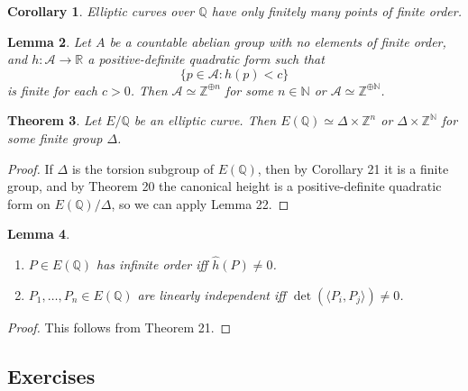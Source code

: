 \documentclass[a4paper]{article}
\newtheorem{theorem}{Theorem}
\newtheorem{lemma}[theorem]{Lemma}
\newtheorem{corollary}[theorem]{Corollary}
\theoremstyle{definition}
\newcommand{\A}{\mathcal{A}}
\newcommand{\N}{\mathbb{N}}
\newcommand{\Z}{\mathbb{Z}}
\newcommand{\Q}{\mathbb{Q}}
\newcommand{\R}{\mathbb{R}}
\begin{document}
\begin{corollary}
    Elliptic curves over $\Q$ have only finitely many points of finite order.
\end{corollary}

\begin{lemma}
    Let $A$ be a countable abelian group with no elements of finite order, and
    $h:\A\to\R$ a positive-definite quadratic form such that
    \begin{equation*}
        \{p\in\A:h(p)<c\}
    \end{equation*}
    is finite for each $c>0$. Then $\A\simeq\Z^{\oplus n}$ for some $n\in\N$ or
    $\A\simeq\Z^{\oplus\N}$.
\end{lemma}

\begin{theorem}
    Let $E/\Q$ be an elliptic curve. Then $E(\Q)\simeq\Delta\times\Z^n$ or
    $\Delta\times\Z^\N$ for some finite group $\Delta$.
\end{theorem}

\begin{proof}
    If $\Delta$ is the torsion subgroup of $E(\Q)$, then by Corollary 21 it is a
    finite group, and by Theorem 20 the canonical height is a positive-definite
    quadratic form on $E(\Q)/\Delta$, so we can apply Lemma 22.
\end{proof}

\begin{lemma}
    ~
    \begin{enumerate}[label=(\roman*)]
        \item $P\in E(\Q)$ has infinite order iff $\hat h(P)\ne0$.
        \item $P_1,\ldots,P_n\in E(\Q)$ are linearly independent iff
            $\det(\langle P_i,P_j\rangle)\ne0$.
    \end{enumerate}
\end{lemma}

\begin{proof}
    This follows from Theorem 21.
\end{proof}

\subsection*{Exercises}
\end{document}

